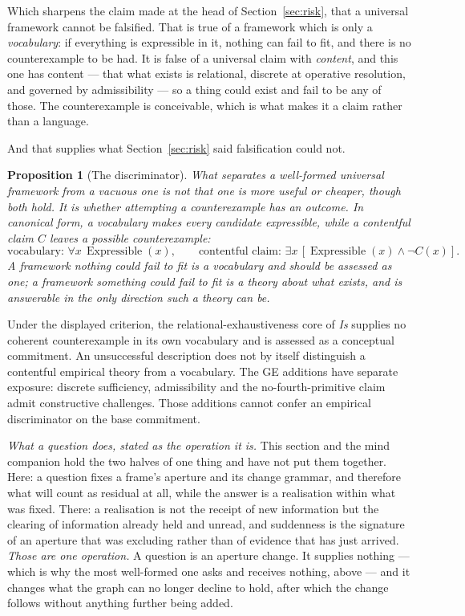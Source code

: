 \documentclass[11pt,a4paper]{article}
\newtheorem{proposition}{Proposition}[section]
\begin{document}
Which sharpens the claim made at the head of Section~\ref{sec:risk}, that a universal framework cannot be
falsified. That is true of a framework which is only a \emph{vocabulary}: if everything is expressible
in it, nothing can fail to fit, and there is no counterexample to be had. It is false of a universal
claim with \emph{content}, and this one has content --- that what exists is relational, discrete at
operative resolution, and governed by admissibility --- so a thing could exist and fail to be any of
those. The counterexample is conceivable, which is what makes it a claim rather than a language.

And that supplies what Section~\ref{sec:risk} said falsification could not.

\begin{proposition}[The discriminator]\label{prop:discriminator}
What separates a well-formed universal framework from a vacuous one is not that one is more useful or
cheaper, though both hold. It is whether \emph{attempting} a counterexample has an outcome. In canonical
form, a vocabulary makes every candidate expressible, while a contentful claim $C$ leaves a possible
counterexample:
\[
\text{vocabulary: }\forall x\,\operatorname{Expressible}(x),
\qquad
\text{contentful claim: }\exists x\,[\operatorname{Expressible}(x)\land\neg C(x)].
\]
A framework nothing could fail to fit is a vocabulary and should be assessed as one; a framework
something could fail to fit is a theory about what exists, and is answerable in the only direction
such a theory can be.
\end{proposition}

Under the displayed criterion, the relational-exhaustiveness core of
\emph{Is} supplies no coherent counterexample in its own vocabulary and is
assessed as a conceptual commitment. An unsuccessful description does not
by itself distinguish a contentful empirical theory from a vocabulary.
The GE additions have separate exposure: discrete sufficiency, admissibility
and the no-fourth-primitive claim admit constructive challenges. Those
additions cannot confer an empirical discriminator on the base commitment.

\emph{What a question does, stated as the operation it is.} This section and the mind companion hold
the two halves of one thing and have not put them together. Here: a question fixes a frame's aperture
and its change grammar, and therefore what will count as residual at all, while the answer is a
realisation within what was fixed. There: a realisation is not the receipt of new information but the
clearing of information already held and unread, and suddenness is the signature of an aperture that
was excluding rather than of evidence that has just arrived. \emph{Those are one operation.} A question
is an aperture change. It supplies nothing --- which is why the most well-formed one asks and receives
nothing, above --- and it changes what the graph can no longer decline to hold, after which the change
follows without anything further being added.
\end{document}

